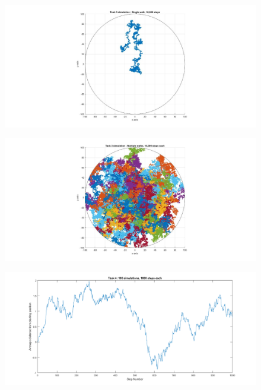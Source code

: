 \documentclass[10pt, a4paper]{article}
\begin{document}
\begin{figure}[H]
    \includegraphics[width=\textwidth]{Diagrams/Task 3 Testing/single_walk_Task_3.jpeg}
    \caption{}
    \label{fig:3}
\end{figure}

\begin{figure}[H]
    \includegraphics[width=\textwidth]{Diagrams/Task 3 Testing/multiple_walks_Task_3.jpeg}
    \caption{}
    \label{fig:4}
\end{figure}

\begin{figure}[H]
    \includegraphics[width=\textwidth]{Diagrams/Task 4 Testing/graph.png}
    \caption{}
    \label{fig:5}
\end{figure}
\end{document}
